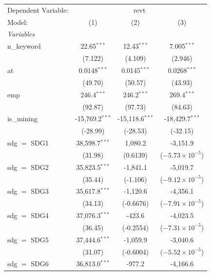 
\begingroup
\centering
\begin{tabular}{lccc}
   \tabularnewline \midrule \midrule
   Dependent Variable: & \multicolumn{3}{c}{revt}\\
   Model:        & (1)               & (2)               & (3)\\  
   \midrule
   \emph{Variables}\\
   n\_keyword    & 22.65$^{***}$     & 12.43$^{***}$     & 7.005$^{***}$\\   
                 & (7.122)           & (4.109)           & (2.946)\\   
   at            & 0.0148$^{***}$    & 0.0145$^{***}$    & 0.0268$^{***}$\\   
                 & (49.70)           & (50.57)           & (43.93)\\   
   emp           & 246.4$^{***}$     & 246.2$^{***}$     & 269.4$^{***}$\\   
                 & (92.87)           & (97.73)           & (84.63)\\   
   is\_mining    & -15,769.2$^{***}$ & -15,118.6$^{***}$ & -18,429.7$^{***}$\\   
                 & (-28.99)          & (-28.53)          & (-32.15)\\   
   sdg $=$ SDG1  & 38,598.7$^{***}$  & 1,080.2           & -3,151.9\\   
                 & (31.98)           & (0.6139)          & ($-5.73\times 10^{-5}$)\\    
   sdg $=$ SDG2  & 35,823.5$^{***}$  & -1,841.1          & -5,019.7\\   
                 & (35.44)           & (-1.106)          & ($-9.12\times 10^{-5}$)\\    
   sdg $=$ SDG3  & 35,617.8$^{***}$  & -1,120.6          & -4,356.1\\   
                 & (34.13)           & (-0.6676)         & ($-7.91\times 10^{-5}$)\\    
   sdg $=$ SDG4  & 37,076.3$^{***}$  & -423.6            & -4,023.5\\   
                 & (36.45)           & (-0.2554)         & ($-7.31\times 10^{-5}$)\\    
   sdg $=$ SDG5  & 37,444.6$^{***}$  & -1,059.9          & -3,040.6\\   
                 & (31.07)           & (-0.6004)         & ($-5.52\times 10^{-5}$)\\    
   sdg $=$ SDG6  & 36,813.0$^{***}$  & -977.2            & -4,166.6\\   

\end{tabular}
